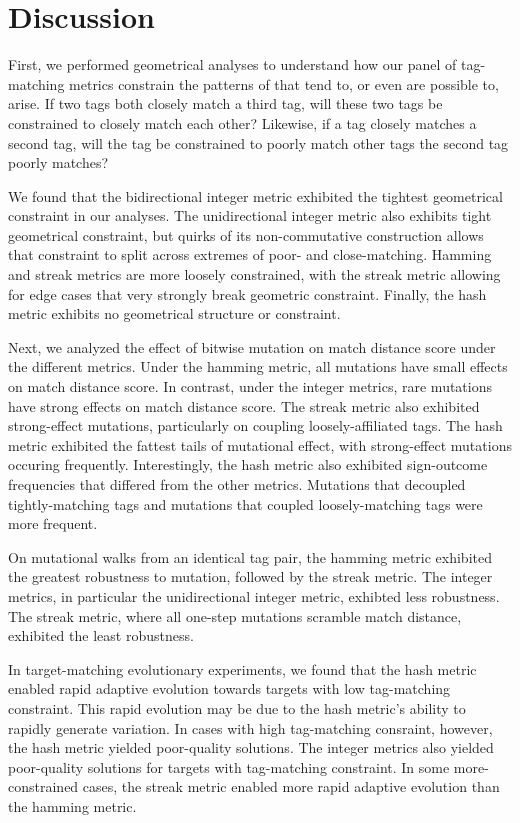\section{Discussion}

% 
First, we performed geometrical analyses to understand how our panel of tag-matching metrics constrain the patterns of that tend to, or even are possible to, arise.
If two tags both closely match a third tag, will these two tags be constrained to closely match each other?
Likewise, if a tag closely matches a second tag, will the tag be constrained to poorly match other tags the second tag poorly matches?

We found that the bidirectional integer metric exhibited the tightest geometrical constraint in our analyses.
The unidirectional integer metric also exhibits tight geometrical constraint, but quirks of its non-commutative construction allows that constraint to split across extremes of poor- and close-matching.
Hamming and streak metrics are more loosely constrained, with the streak metric allowing for edge cases that very strongly break geometric constraint.
Finally, the hash metric exhibits no geometrical structure or constraint.

Next, we analyzed the effect of bitwise mutation on match distance score under the different metrics.
Under the hamming metric, all mutations have small effects on match distance score.
In contrast, under the integer metrics, rare mutations have strong effects on match distance score.
The streak metric also exhibited strong-effect mutations, particularly on coupling loosely-affiliated tags.
The hash metric exhibited the fattest tails of mutational effect, with strong-effect mutations occuring frequently.
Interestingly, the hash metric also exhibited sign-outcome frequencies that differed from the other metrics.
Mutations that decoupled tightly-matching tags and mutations that coupled loosely-matching tags were more frequent.

On mutational walks from an identical tag pair, the hamming metric exhibited the greatest robustness to mutation, followed by the streak metric.
The integer metrics, in particular the unidirectional integer metric, exhibted less robustness.
The streak metric, where all one-step mutations scramble match distance, exhibited the least robustness.

In target-matching evolutionary experiments, we found that the hash metric enabled rapid adaptive evolution towards targets with low tag-matching constraint.
This rapid evolution may be due to the hash metric's ability to rapidly generate variation.
In cases with high tag-matching consraint, however, the hash metric yielded poor-quality solutions.
The integer metrics also yielded poor-quality solutions for targets with tag-matching constraint.
In some more-constrained cases, the streak metric enabled more rapid adaptive evolution than the hamming metric.

